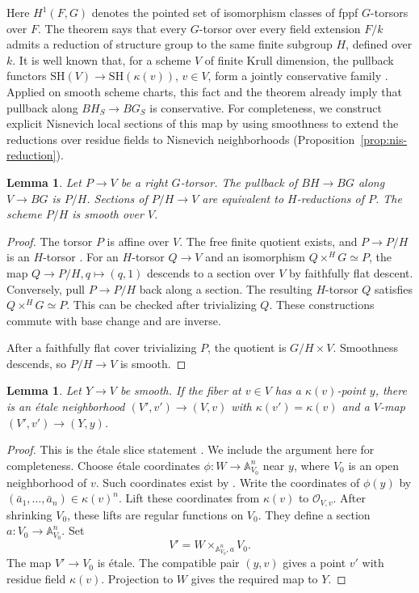 \documentclass[11pt,reqno]{amsart}
\newtheorem{lemma}[theorem]{Lemma}
\theoremstyle{definition}
\theoremstyle{remark}
\theoremstyle{plain}
\numberwithin{equation}{section}
\newcommand{\SH}{\mathrm{SH}}
\newcommand{\A}{\mathbb A}
\begin{document}
Here \(H^1(F,G)\) denotes the pointed set of isomorphism classes of fppf \(G\)-torsors over \(F\).
The theorem says that every \(G\)-torsor over every field extension \(F/k\) admits a reduction 
of structure group to the same finite subgroup \(H\), defined over \(k\).
It is well known that, for a scheme \(V\) of finite Krull dimension, the pullback functors
\(\SH(V)\to\SH(\kappa(v))\), \(v\in V\), form a jointly conservative family
\cite[Proposition~B.3]{BachmannHoyoisNorms}.
Applied on smooth scheme charts, this fact and the theorem already imply that pullback 
along \(BH_S\to BG_S\) is conservative.
For completeness, we construct explicit Nisnevich local sections of this map by using smoothness 
to extend the reductions over residue fields to Nisnevich neighborhoods (Proposition~\ref{prop:nis-reduction}).

\begin{lemma}\label{lem:torsor-reduction}
Let \(P\to V\) be a right \(G\)-torsor.
The pullback of \(BH\to BG\) along \(V\to BG\) is \(P/H\).
Sections of \(P/H\to V\) are equivalent to \(H\)-reductions of \(P\).
The scheme \(P/H\) is smooth over \(V\).
\end{lemma}
\begin{proof}
The torsor \(P\) is affine over \(V\).
The free finite quotient exists, and \(P\to P/H\) is an \(H\)-torsor
\cite[Tag~07S7]{Stacks}.
For an \(H\)-torsor \(Q\to V\) and an isomorphism \(Q\times^H G\simeq P\),
the map \(Q\to P/H, q \mapsto (q, 1)\) descends to a section over \(V\) by faithfully flat descent.
Conversely, pull \(P\to P/H\) back along a section.
The resulting \(H\)-torsor \(Q\) satisfies \(Q\times^H G\simeq P\).
This can be checked after trivializing \(Q\).
These constructions commute with base change and are inverse.

After a faithfully flat cover trivializing \(P\), the quotient is \(G/H\times V\).
Smoothness descends, so \(P/H\to V\) is smooth.
\end{proof}

\begin{lemma}\label{lem:nisnevich-slice}
Let \(Y\to V\) be smooth.
If the fiber at \(v\in V\) has a \(\kappa(v)\)-point \(y\),
there is an étale neighborhood \((V',v')\to(V,v)\) with
\(\kappa(v')=\kappa(v)\) and a \(V\)-map \((V',v')\to (Y,y)\).
\end{lemma}
\begin{proof}
This is the étale slice statement \cite[Tag~057G]{Stacks}.
We include the argument here for completeness.
Choose étale coordinates \(\phi: W\to\A^n_{V_0}\) near \(y\), 
where \(V_0\) is an open neighborhood of \(v\).
Such coordinates exist by \cite[Tag~039Q]{Stacks}.
Write the coordinates of \(\phi(y)\) by \((\bar a_1,\ldots,\bar a_n)\in\kappa(v)^n.\)
Lift these coordinates from \(\kappa(v)\) to \(\mathcal O_{V,v}\).
After shrinking \(V_0\), these lifts are regular functions on \(V_0\).
They define a section \(a:V_0\to\A^n_{V_0}\).
Set
\[
 V'=W\times_{\A^n_{V_0},a}V_0.
\]
The map \(V'\to V_0\) is étale.
The compatible pair \((y,v)\) gives a point \(v'\) with residue field \(\kappa(v)\).
Projection to \(W\) gives the required map to \(Y\).
\end{proof}
\end{document}
